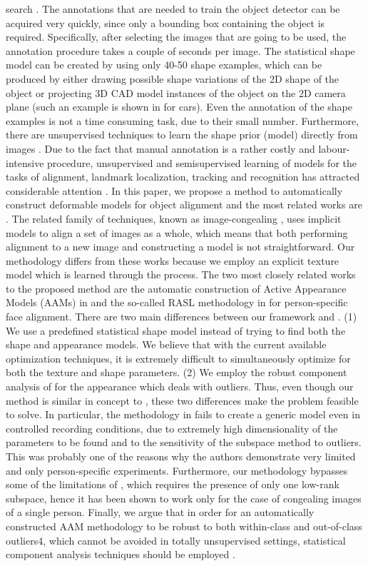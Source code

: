 search \cite{?}. The
annotations that are needed to train the object detector can
be acquired very quickly, since only a bounding box containing the object is required. Specifically, after selecting
the images that are going to be used, the annotation procedure
takes a couple of seconds per image. The statistical
shape model can be created by using only 40-50 shape examples,
which can be produced by either drawing possible
shape variations of the 2D shape of the object or projecting
3D CAD model instances of the object on the 2D camera
plane (such an example is shown in \cite{?} for cars). Even
the annotation of the shape examples is not a time consuming
task, due to their small number. Furthermore, there are
unsupervised techniques to learn the shape prior (model) directly
from images \cite{?}.
Due to the fact that manual annotation is a rather costly
and labour-intensive procedure, unsupervised and semisupervised
learning of models for the tasks of alignment,
landmark localization, tracking and recognition has attracted
considerable attention \cite{?}. In this paper, we
propose a method to automatically construct deformable
models for object alignment and the most related works
are \cite{?}. The related family of techniques,
known as image-congealing \cite{?}, uses implicit
models to align a set of images as a whole, which means
that both performing alignment to a new image and constructing
a model is not straightforward. Our methodology
differs from these works because we employ an explicit texture
model which is learned through the process.
The two most closely related works to the proposed
method are the automatic construction of Active Appearance
Models (AAMs) in \cite{?} and the so-called RASL
methodology in \cite{?} for person-specific face alignment.
There are two main differences between our framework
and \cite{?}. (1) We use a predefined statistical shape model
instead of trying to find both the shape and appearance models.
We believe that with the current available optimization
techniques, it is extremely difficult to simultaneously optimize
for both the texture and shape parameters. (2) We
employ the robust component analysis of \cite{?} for the appearance
which deals with outliers. Thus, even though
our method is similar in concept to \cite{?}, these two differences
make the problem feasible to solve. In particular, the
methodology in \cite{?} fails to create a generic model even in
controlled recording conditions, due to extremely high dimensionality
of the parameters to be found and to the sensitivity
of the subspace method to outliers. This was probably
one of the reasons why the authors demonstrate very
limited and only person-specific experiments. Furthermore,
our methodology bypasses some of the limitations of \cite{?},
which requires the presence of only one low-rank subspace,
hence it has been shown to work only for the case of congealing
images of a single person. Finally, we argue that
in order for an automatically constructed AAM methodology
to be robust to both within-class and out-of-class outliers4,
which cannot be avoided in totally unsupervised settings,
statistical component analysis techniques should be
employed \cite{?}. 

\clearpage